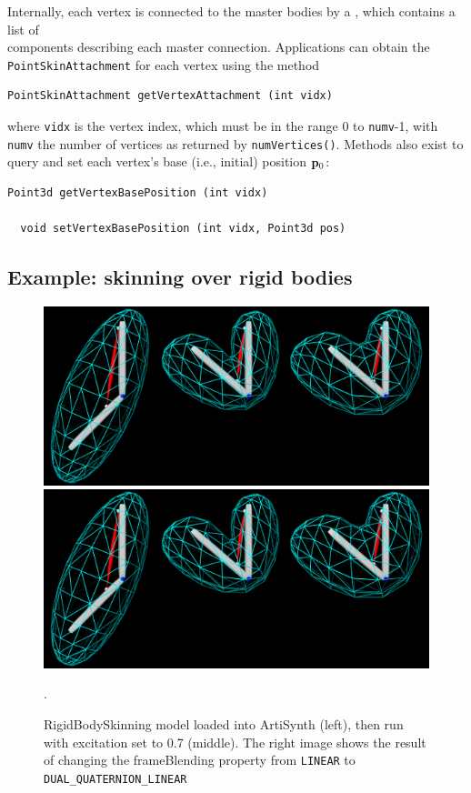 Internally, each vertex is connected to the master bodies by a
, which
contains a list
of\\ 
components describing each master connection. Applications can obtain
the {\tt PointSkinAttachment} for each vertex using the method
%
\begin{lstlisting}[]
  PointSkinAttachment getVertexAttachment (int vidx)
\end{lstlisting}
%
where {\tt vidx} is the vertex index, which must be in the range 0 to
{\tt numv}-1, with {\tt numv} the number of vertices as returned by
{\tt numVertices()}.  Methods also exist to query and set each
vertex's base (i.e., initial) position ${\bf p}_0$:
%
\begin{lstlisting}[]
  Point3d getVertexBasePosition (int vidx)

  void setVertexBasePosition (int vidx, Point3d pos)
\end{lstlisting}
%

\subsection{Example: skinning over rigid bodies}

\begin{figure}[t]
\begin{center}
\iflatexml
 \includegraphics[]{images/RigidBodySkinningAll}
\else
 \includegraphics[width=6in]{images/RigidBodySkinningAll}
\fi
\end{center}
\caption{RigidBodySkinning model loaded into ArtiSynth (left), then
run with excitation set to 0.7 (middle). The right image shows the
result of changing the {\sf frameBlending} property from {\tt LINEAR}
to {\tt DUAL\_QUATERNION\_LINEAR}}.
\label{RigidBodySkinning:fig}
\end{figure}

